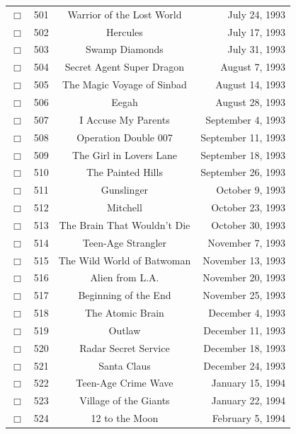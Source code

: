 \documentclass[12pt]{article}
\begin{document}
\begin{center}
\begin{longtable}[c]{cccr}
\\  %
$\Box$&501&Warrior of the Lost World&July 24, 1993\\
$\Box$&502&Hercules&July 17, 1993\\
$\Box$&503&Swamp Diamonds&July 31, 1993\\
$\Box$&504&Secret Agent Super Dragon&August  7, 1993\\
$\Box$&505&The Magic Voyage of Sinbad&August 14, 1993\\
$\Box$&506&Eegah&August 28, 1993\\
$\Box$&507&I Accuse My Parents&September  4, 1993\\
$\Box$&508&Operation Double 007&September 11, 1993\\
$\Box$&509&The Girl in Lovers Lane&September 18, 1993\\
$\Box$&510&The Painted Hills&September 26, 1993\\
$\Box$&511&Gunslinger&October  9, 1993\\
$\Box$&512&Mitchell&October 23, 1993\\
$\Box$&513&The Brain That Wouldn't Die&October 30, 1993\\
$\Box$&514&Teen-Age Strangler&November  7, 1993\\
$\Box$&515&The Wild World of Batwoman&November 13, 1993\\
$\Box$&516&Alien from L.A.&November 20, 1993\\
$\Box$&517&Beginning of the End&November 25, 1993\\
$\Box$&518&The Atomic Brain&December  4, 1993\\
$\Box$&519&Outlaw&December 11, 1993\\
$\Box$&520&Radar Secret Service&December 18, 1993\\
$\Box$&521&Santa Claus&December 24, 1993\\
$\Box$&522&Teen-Age Crime Wave&January 15, 1994\\
$\Box$&523&Village of the Giants&January 22, 1994\\
$\Box$&524&12 to the Moon&February  5, 1994\\  %


\end{longtable}
\end{center}
\end{document}

